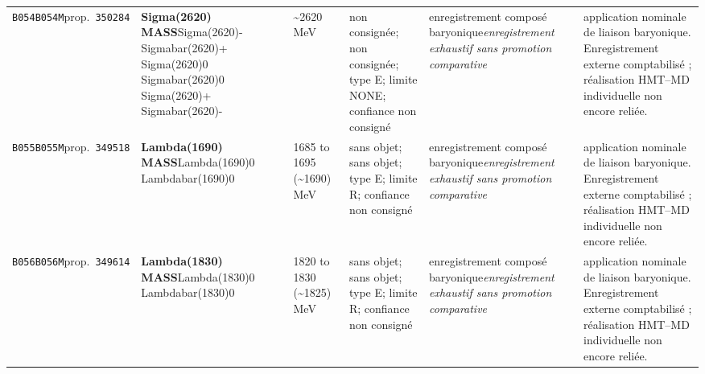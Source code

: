 \begin{landscape}
\begin{longtable}{L{1.85cm}L{4.45cm}L{2.35cm}L{4.05cm}L{3.35cm}L{7.15cm}}
\texttt{B054}\newline \texttt{B054M}\newline prop.\ \texttt{350284} & \textbf{Sigma(2620) MASS}\newline Sigma(2620)- \textbar{}\allowbreak{} Sigmabar(2620)+ \textbar{}\allowbreak{} Sigma(2620)0 \textbar{}\allowbreak{} Sigmabar(2620)0 \textbar{}\allowbreak{} Sigma(2620)+ \textbar{}\allowbreak{} Sigmabar(2620)- & \textasciitilde{}2620\,MeV & non consignée; non consignée; type E; limite NONE; confiance non consigné & enregistrement composé baryonique\newline \emph{enregistrement exhaustif sans promotion comparative} & application nominale de liaison baryonique. Enregistrement externe comptabilisé ; réalisation HMT--MD individuelle non encore reliée. \\
\texttt{B055}\newline \texttt{B055M}\newline prop.\ \texttt{349518} & \textbf{Lambda(1690) MASS}\newline Lambda(1690)0 \textbar{}\allowbreak{} Lambdabar(1690)0 & 1685 to 1695 (\textasciitilde{}1690)\,MeV & sans objet; sans objet; type E; limite R; confiance non consigné & enregistrement composé baryonique\newline \emph{enregistrement exhaustif sans promotion comparative} & application nominale de liaison baryonique. Enregistrement externe comptabilisé ; réalisation HMT--MD individuelle non encore reliée. \\
\texttt{B056}\newline \texttt{B056M}\newline prop.\ \texttt{349614} & \textbf{Lambda(1830) MASS}\newline Lambda(1830)0 \textbar{}\allowbreak{} Lambdabar(1830)0 & 1820 to 1830 (\textasciitilde{}1825)\,MeV & sans objet; sans objet; type E; limite R; confiance non consigné & enregistrement composé baryonique\newline \emph{enregistrement exhaustif sans promotion comparative} & application nominale de liaison baryonique. Enregistrement externe comptabilisé ; réalisation HMT--MD individuelle non encore reliée. \\

\end{longtable}
\end{landscape}
